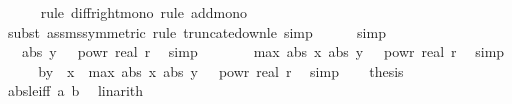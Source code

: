 \begin{isabellebody}
\ \ \ \ \isamarkupfalse%
\ {\isacharparenleft}{\kern0pt}rule\ diff{\isacharunderscore}{\kern0pt}right{\isacharunderscore}{\kern0pt}mono{\isacharcomma}{\kern0pt}\ rule\ add{\isacharunderscore}{\kern0pt}mono{\isacharparenright}{\kern0pt}\isanewline
\ \ \ \ \ \isamarkupfalse%
\ {\isacharparenleft}{\kern0pt}subst\ assms{\isacharparenleft}{\kern0pt}{}{\isacharparenright}{\kern0pt}{\isacharbrackleft}{\kern0pt}symmetric{\isacharbrackright}{\kern0pt}{\isacharcomma}{\kern0pt}\ rule\ truncate{\isacharunderscore}{\kern0pt}down{\isacharunderscore}{\kern0pt}le{\isacharcomma}{\kern0pt}\ simp{\isacharparenright}{\kern0pt}\isanewline
\ \ \ \ \isamarkupfalse%
\ simp\isanewline
\ \ \isamarkupfalse%
\ \isamarkupfalse%
\ {\isachardoublequoteopen}{\isachardot}{\kern0pt}{\isachardot}{\kern0pt}{\isachardot}{\kern0pt}\ {\isasymle}\ abs\ y\ {\isacharasterisk}{\kern0pt}\ {}\ powr\ {\isacharparenleft}{\kern0pt}{\isacharminus}{\kern0pt}real\ r{\isacharparenright}{\kern0pt}{\isachardoublequoteclose}\ \isamarkupfalse%
\ simp\isanewline
\ \ \isamarkupfalse%
\ \isamarkupfalse%
\ {\isachardoublequoteopen}{\isachardot}{\kern0pt}{\isachardot}{\kern0pt}{\isachardot}{\kern0pt}\ {\isasymle}\ max\ {\isacharparenleft}{\kern0pt}abs\ x{\isacharparenright}{\kern0pt}\ {\isacharparenleft}{\kern0pt}abs\ y{\isacharparenright}{\kern0pt}\ {\isacharasterisk}{\kern0pt}\ {}\ powr\ {\isacharparenleft}{\kern0pt}{\isacharminus}{\kern0pt}real\ r{\isacharparenright}{\kern0pt}{\isachardoublequoteclose}\ \isamarkupfalse%
\ simp\isanewline
\ \ \isamarkupfalse%
\ \isamarkupfalse%
\ b{\isacharcolon}{\kern0pt}{\isachardoublequoteopen}y\ {\isacharminus}{\kern0pt}\ x\ {\isasymle}\ max\ {\isacharparenleft}{\kern0pt}abs\ x{\isacharparenright}{\kern0pt}\ {\isacharparenleft}{\kern0pt}abs\ y{\isacharparenright}{\kern0pt}\ {\isacharasterisk}{\kern0pt}\ {}\ powr\ {\isacharparenleft}{\kern0pt}{\isacharminus}{\kern0pt}real\ r{\isacharparenright}{\kern0pt}{\isachardoublequoteclose}\ \isamarkupfalse%
\ simp\isanewline
\isanewline
\ \ \isamarkupfalse%
\ {\isacharquery}{\kern0pt}thesis\isanewline
\ \ \ \ \isamarkupfalse%
\ abs{\isacharunderscore}{\kern0pt}le{\isacharunderscore}{\kern0pt}iff\ a\ b\ \isamarkupfalse%
\ linarith\isanewline
{}\isamarkupfalse%
%
\endisatagproof
{\isafoldproof}%
%
\isadelimproof
\isanewline
%
\endisadelimproof

\end{isabellebody}
